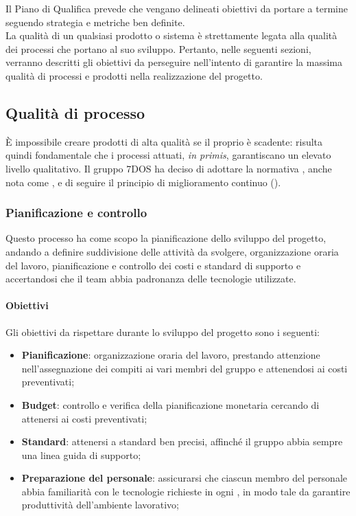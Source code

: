 Il Piano di Qualifica prevede che vengano delineati obiettivi da portare a termine seguendo strategia e metriche ben definite.\\
La qualità di un qualsiasi prodotto o sistema è strettamente legata alla qualità dei processi che portano al suo sviluppo. Pertanto, nelle seguenti sezioni, verranno descritti gli obiettivi da perseguire nell'intento di garantire la massima qualità di processi e prodotti nella realizzazione del progetto.

\subsection{Qualità di processo}
	È impossibile creare prodotti di alta qualità se il proprio  è scadente: risulta quindi fondamentale che i processi attuati, \emph{in primis}, garantiscano un elevato livello qualitativo. Il gruppo 7DOS ha deciso di adottare la normativa , anche nota come , e di seguire il principio di miglioramento continuo (). 


\subsubsection{Pianificazione e controllo} 
Questo processo ha come scopo la pianificazione dello sviluppo del progetto, andando a definire suddivisione delle attività da svolgere, organizzazione oraria del lavoro, pianificazione e controllo dei costi e standard di supporto e accertandosi che il team abbia padronanza delle tecnologie utilizzate.
\paragraph{Obiettivi} \Spazio
Gli obiettivi da rispettare durante lo sviluppo del progetto sono i seguenti:
	\begin{itemize}
		\item{\textbf{Pianificazione}: organizzazione oraria del lavoro, prestando attenzione nell'assegnazione dei compiti ai vari membri del gruppo e attenendosi ai costi preventivati;
		}
		\item{\textbf{Budget}: controllo e verifica della pianificazione monetaria cercando di attenersi ai costi preventivati;
		}
		\item{\textbf{Standard}: attenersi a standard ben precisi, affinché il gruppo abbia sempre una linea guida di supporto;
		}
		\item{\textbf{Preparazione del personale}: assicurarsi che ciascun membro del personale abbia familiarità con le tecnologie richieste in ogni , in modo tale da garantire produttività dell'ambiente lavorativo;
		}
	\end{itemize}

